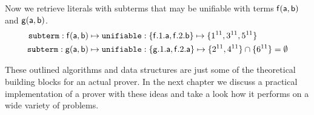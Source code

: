 \begin{example}
\begin{center}
	\end{center}

	Now we retrieve literals with subterms that may be unifiable
	with terms \( \mathsf{f}(\mathsf{a},\mathsf{b}) \) and \( \mathsf{g}(\mathsf{a},\mathsf{b}) \).
	\begin{align*}
		\texttt{subterm}: \mathsf{f}(\mathsf{a},\mathsf{b})
		&\mapsto \texttt{unifiable}: \{ \mathsf{f}.1.\mathsf{a}, \mathsf{f}.2.\mathsf{b}  \}
		\mapsto \{ 1^{11}, 3^{11}, 5^{11}  \}
		\\
		\texttt{subterm}: \mathsf{g}(\mathsf{a},\mathsf{b})
		&\mapsto
		\texttt{unifiable}: \{ \mathsf{g}.1.\mathsf{a}, \mathsf{f}.2.\mathsf{a}  \}
		\mapsto
		\{ 2^{11}, 4^{11} \} \cap \{ 6^{11} \} = \emptyset
	\end{align*}
\end{example}

These outlined algorithms and data structures 
are just some of the theoretical building blocks for an actual prover. 
In the next chapter we discuss a practical implementation of a prover 
with these ideas and take a look how it performs on a wide variety of problems. 
















% 



